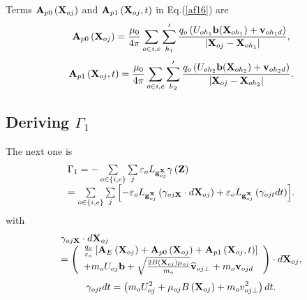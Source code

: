 \documentclass[12pt]{iopart}
\begin{document}
Terms ${{{\bf{A}}_{p0}}\left( {{{\bf{X}}_{oj}}} \right)}$ and ${{{\bf{A}}_{p1}}\left( {{{\bf{X}}_{oj}},t} \right)}$ in Eq.(\ref{af16}) are
\begin{equation}\label{af19}
{{\bf{A}}_{p0}}\left( {{{\bf{X}}_{oj}}} \right) = \frac{{{\mu _0}}}{{4\pi }}\sum\limits_{o \in i,e} {\sum\limits_{{h_1}}' {\frac{{{q_o}\left( {{U_{o{h_1}}}{\bf{b}}(\mathbf{X}_{oh_1}) + {{\bf{v}}_{o{h_1}d}}} \right)}}{{|{{\bf{X}}_{oj}} - {{\bf{X}}_{o{h_1}}}|}}} },
\end{equation}
\begin{equation}\label{af20}
{{\bf{A}}_{p1}}\left( {{{\bf{X}}_{oj}},t} \right) = \frac{{{\mu _0}}}{{4\pi }}\sum\limits_{o \in i,e} {\sum\limits_{{h_2}}' {\frac{{{q_o}\left( {{U_{o{h_2}}}{\bf{b}}(\mathbf{X}_{oh_2}) + {{\bf{v}}_{o{h_2}d}}} \right)}}{{|{{\bf{X}}_{oj}} - {{\bf{X}}_{o{h_2}}}|}}} }.
\end{equation}

\subsection{Deriving $\Gamma_1$}

The next one is
\begin{equation}\label{af22}
\begin{array}{l}
{\Gamma _1} =  - \sum\limits_{o \in \{ i,e\} } {\sum\limits_j {{\varepsilon _o}{L_{{\bf{g}}_{oj}^{\bf{X}}}}\gamma \left( {\bf{Z}} \right)} } \\
 = \sum\limits_{o \in \{ i,e\} } {\sum\limits_j {\left[ { - {\varepsilon _o}{L_{{\bf{g}}_{oj}^{\bf{X}}}}\left( {{\gamma _{oj{\bf{X}}}}\cdot d{{\bf{X}}_{oj}}} \right) + {\varepsilon _o}{L_{{\bf{g}}_{oj}^{\bf{X}}}}\left( {{\gamma _{ojt}}dt} \right)} \right]} } .
\end{array}
\end{equation}
with
\begin{equation}\label{af23}
\begin{array}{*{20}{l}}
{{\gamma _{oj{\bf{X}}}}\cdot d{{\bf{X}}_{oj}}}\\
{ = \left( {\begin{array}{*{20}{l}}
{\frac{{{q_o}}}{{{\varepsilon _o}}}\left[ {{{\bf{A}}_E}\left( {{{\bf{X}}_{oj}}} \right) + {{\bf{A}}_{p0}}\left( {{{\bf{X}}_{oj}}} \right) + {{\bf{A}}_{p1}}\left( {{{\bf{X}}_{oj}},t} \right)} \right]}\\
{ + {m_o}{U_{oj}}{\bf{b}} + \sqrt {\frac{{2B({{\bf{X}}_{oj}}){\mu _{oj}}}}{{{m_o}}}} {{\widehat {\bf{v}}}_{oj \bot }} + {m_o}{{\bf{v}}_{ojd}}}
\end{array}} \right)\cdot d{{\bf{X}}_{oj}},}
\end{array}
\end{equation}
\begin{equation}\label{af24}
{\gamma _{ojt}}dt = \left( {m_o U_{oj}^2 + {\mu _{oj}}B\left( {{{\bf{X}}_{oj}}} \right) + m_o v_{oj \bot }^2} \right)dt.
\end{equation}
\end{document}
